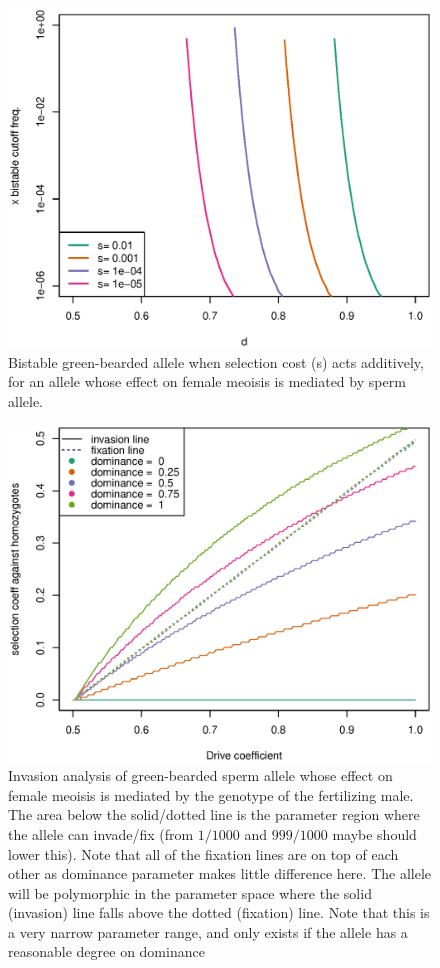 \documentclass[12pt,letterpaper]{article}
\newcommand{\gc}[1]{{ \color{red} #1}}
\begin{document}
\begin{figure}
\includegraphics[width = 0.8 \textwidth]{Figures/bistable_x_vs_d_additive_s.eps} 
\caption{Bistable green-bearded allele when selection cost (s) acts
  additively, for an allele whose effect
 on female meoisis is mediated by sperm allele. }  \label{bistable_additive}
\end{figure}

\begin{figure}
\includegraphics[width = 0.8 \textwidth]{Figures/effect_of_dominance_on_invasion_space_one_graph.eps} 
\caption{Invasion analysis of green-bearded sperm allele whose effect
 on female meoisis is mediated by the genotype of the fertilizing
 male. The area below the solid/dotted line is the parameter region
 where the allele can invade/fix (from $1/1000$ and $999/1000$
 \gc{maybe should lower this}). Note
 that all of the fixation lines are on top of each other as dominance
 parameter makes little difference here. The allele will be
 polymorphic in the parameter space where the solid (invasion) line
 falls above the dotted (fixation) line. Note that this is a very
 narrow parameter range, and only exists if the allele has a
 reasonable degree on dominance}  \label{Effect_of_dominance}
\end{figure}
\end{document}
